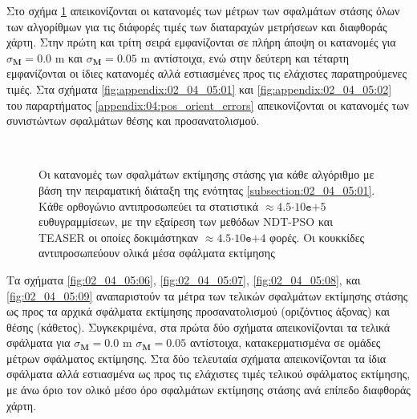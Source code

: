 Στο σχήμα \ref{fig:02_04_05:05} απεικονίζονται οι κατανομές των μέτρων των
σφαλμάτων στάσης όλων των αλγορίθμων για τις διάφορές τιμές των διαταραχών
μετρήσεων και διαφθοράς χάρτη. Στην πρώτη και τρίτη σειρά εμφανίζονται σε πλήρη
άποψη οι κατανομές για $\sigma_{\bm{M}} = 0.0$ m και $\sigma_{\bm{M}} = 0.05$ m
αντίστοιχα, ενώ στην δεύτερη και τέταρτη εμφανίζονται οι ίδιες κατανομές αλλά
εστιασμένες προς τις ελάχιστες παρατηρούμενες τιμές. Στα σχήματα
\ref{fig:appendix:02_04_05:01} και \ref{fig:appendix:02_04_05:02} του
παραρτήματος \ref{appendix:04:pos_orient_errors} απεικονίζονται οι κατανομές
των συνιστώντων σφαλμάτων θέσης και προσανατολισμού.


\begin{figure}\centering\vspace{2cm}
  \begin{subfigure}{\linewidth}\hspace{-1cm}
    
  \end{subfigure}\\\vspace{3cm}%
  \begin{subfigure}{\linewidth}\hspace{-1cm}
    
  \end{subfigure}%
  \vspace{1cm}
\caption{\small Οι κατανομές των σφαλμάτων εκτίμησης στάσης για κάθε αλγόριθμο
         με βάση την πειραματική διάταξη της ενότητας
         \ref{subsection:02_04_05:01}. Κάθε ορθογώνιο αντιπροσωπεύει τα
         στατιστικά $\approx 4.5$$\cdot$$10\texttt{e}$$+$$5$ ευθυγραμμίσεων, με
         την εξαίρεση των μεθόδων NDT-PSO και TEASER οι οποίες δοκιμάστηκαν
         $\approx 4.5$$\cdot$$10\texttt{e}$$+$$4$ φορές. Οι κουκκίδες
         αντιπροσωπεύουν ολικά μέσα σφάλματα εκτίμησης}
\label{fig:02_04_05:05}
\end{figure}


Τα σχήματα \ref{fig:02_04_05:06}, \ref{fig:02_04_05:07}, \ref{fig:02_04_05:08},
και \ref{fig:02_04_05:09} αναπαριστούν τα μέτρα των τελικών σφαλμάτων εκτίμησης
στάσης ως προς τα αρχικά σφάλματα εκτίμησης προσανατολισμού (οριζόντιος άξονας)
και θέσης (κάθετος). Συγκεκριμένα, στα πρώτα δύο σχήματα απεικονίζονται τα
τελικά σφάλματα για $\sigma_{\bm{M}} = 0.0$ m $\sigma_{\bm{M}} = 0.05$
αντίστοιχα, κατακερματισμένα σε ομάδες μέτρων σφάλματος εκτίμησης. Στα δύο
τελευταία σχήματα απεικονίζονται τα ίδια σφάλματα αλλά εστιασμένα ως προς τις
ελάχιστες τιμές τελικού σφάλματος εκτίμησης, με άνω όριο τον ολικό μέσο όρο
σφαλμάτων εκτίμησης στάσης ανά επίπεδο διαφθοράς χάρτη.


